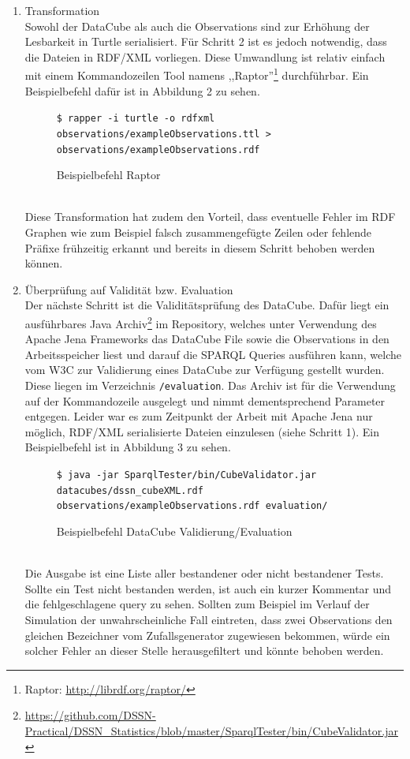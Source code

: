 \documentclass{article}
\begin{document}
\begin{enumerate}
	\item{Transformation\\
	Sowohl der DataCube als auch die Observations sind zur Erhöhung der Lesbarkeit in Turtle serialisiert. Für Schritt 2 ist es jedoch notwendig, dass die Dateien in RDF/XML vorliegen. Diese Umwandlung ist relativ einfach mit einem Kommandozeilen Tool namens ,,Raptor''\footnote{Raptor: \url{http://librdf.org/raptor/}} durchführbar. Ein Beispielbefehl dafür ist in Abbildung 2 zu sehen.
	\begin{figure}[ht]
	\centering
	\texttt{\$ rapper -i turtle -o rdfxml observations/exampleObservations.ttl  > observations/exampleObservations.rdf}
	\caption{Beispielbefehl Raptor}
	\end{figure}
	}\\
	Diese Transformation hat zudem den Vorteil, dass eventuelle Fehler im RDF Graphen wie zum Beispiel falsch zusammengefügte Zeilen oder fehlende Präfixe frühzeitig erkannt und bereits in diesem Schritt behoben werden können.
	\item{Überprüfung auf Validität bzw. Evaluation\\
	Der nächste Schritt ist die Validitätsprüfung des DataCube. Dafür liegt ein ausführbares Java Archiv\footnote{\url{https://github.com/DSSN-Practical/DSSN_Statistics/blob/master/SparqlTester/bin/CubeValidator.jar}} im Repository, welches unter Verwendung des Apache Jena Frameworks das DataCube File sowie die Observations in den Arbeitsspeicher liest und darauf die SPARQL Queries ausführen kann, welche vom W3C zur Validierung eines DataCube zur Verfügung gestellt wurden. Diese liegen im Verzeichnis \texttt{/evaluation}. Das Archiv ist für die Verwendung auf der Kommandozeile ausgelegt und nimmt dementsprechend Parameter entgegen. Leider war es zum Zeitpunkt der Arbeit mit Apache Jena nur möglich, RDF/XML serialisierte Dateien einzulesen (siehe Schritt 1). Ein Beispielbefehl ist in Abbildung 3 zu sehen.\\
	\begin{figure}[ht]
	\centering
	\texttt{\$ java -jar SparqlTester/bin/CubeValidator.jar datacubes/dssn\_cubeXML.rdf observations/exampleObservations.rdf evaluation/}
	\caption{Beispielbefehl DataCube Validierung/Evaluation}
	\end{figure}\\
	Die Ausgabe ist eine Liste aller bestandener oder nicht bestandener Tests. Sollte ein Test nicht bestanden werden, ist auch ein kurzer Kommentar und die fehlgeschlagene query zu sehen. Sollten zum Beispiel im Verlauf der Simulation der unwahrscheinliche Fall eintreten, dass zwei Observations den gleichen Bezeichner vom Zufallsgenerator zugewiesen bekommen, würde ein solcher Fehler an dieser Stelle herausgefiltert und könnte behoben werden.
}
\end{enumerate}
\end{document}
